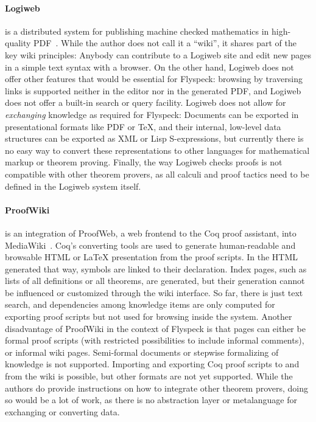 \paragraph{Logiweb} is a distributed system for publishing machine checked mathematics in
high-quality PDF~\cite{Grue:Logiweb07}.  While the author does not call it a ``wiki'', it
shares part of the key wiki principles: Anybody can contribute to a Logiweb site and edit
new pages in a simple text syntax with a browser.  On the other hand, Logiweb does not
offer other features that would be essential for Flyspeck: browsing by traversing links is
supported neither in the editor nor in the generated PDF, and Logiweb does not offer a
built-in search or query facility.  Logiweb does not allow for \emph{exchanging} knowledge
as required for Flyspeck: Documents can be exported in presentational formats like PDF or
\TeX{}, and their internal, low-level data structures can be exported as XML or Lisp
S-expressions, but currently there is no easy way to convert these representations to
other languages for mathematical markup or theorem proving.  Finally, the way Logiweb
checks proofs is not compatible with other theorem provers, as all calculi and proof
tactics need to be defined in the Logiweb system itself.

\paragraph{ProofWiki} is an integration of ProofWeb, a web frontend to the Coq proof
assistant, into MediaWiki~\cite{CorKal:CoopReposFormalProofs07}.  Coq's converting tools
are used to generate human-readable and browsable HTML or {\LaTeX} presentation from the proof
scripts.  In the HTML generated that way, symbols are linked to their declaration.  Index
pages, such as lists of all definitions or all theorems, are generated, but their
generation cannot be influenced or customized through the wiki
interface.  So far, there is just text search, and dependencies
among knowledge items are only computed for exporting proof scripts but not used for
browsing inside the system.  Another disadvantage of ProofWiki in the context of Flyspeck
is that pages can either be formal proof scripts (with restricted possibilities to include
informal comments), or informal wiki pages.  Semi-formal documents or stepwise formalizing
of knowledge is not supported.  Importing and exporting Coq proof scripts to and from the
wiki is possible, but other formats are not yet supported.  While the authors do provide
instructions on how to integrate other theorem provers, doing so would be a lot of work,
as there is no abstraction layer or metalanguage for exchanging or converting data.


